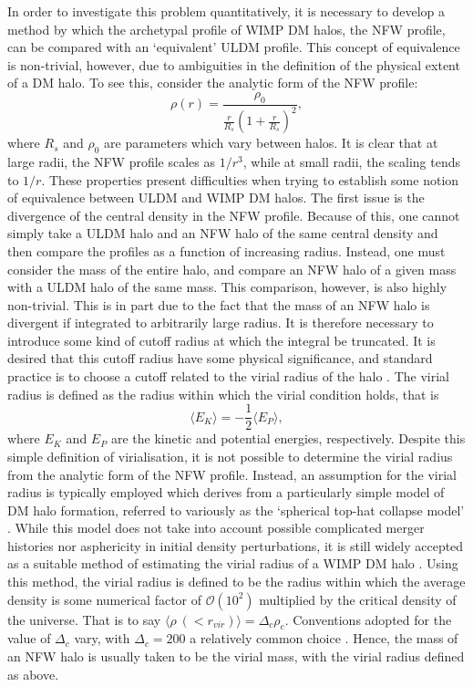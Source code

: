 In order to investigate this problem quantitatively, it is necessary to develop a method by which the archetypal profile of WIMP DM halos, the NFW profile, can be compared with an `equivalent' ULDM profile. This concept of equivalence is non-trivial, however, due to ambiguities in the definition of the physical extent of a DM halo. To see this, consider the analytic form of the NFW profile:
\begin{equation}
    \rho(r)=\frac{\rho_0}{\frac{r}{R_s}\left(1+\frac{r}{R_s}\right)^2},
\end{equation}
where $R_s$ and $\rho_0$ are parameters which vary between halos. It is clear that at large radii, the NFW profile scales as $1/r^3$, while at small radii, the scaling tends to $1/r$. These properties present difficulties when trying to establish some notion of equivalence between ULDM and WIMP DM halos. The first issue is the divergence of the central density in the NFW profile. Because of this, one cannot simply take a ULDM halo and an NFW halo of the same central density and then compare the profiles as a function of increasing radius. Instead, one must consider the mass of the entire halo, and compare an NFW halo of a given mass with a ULDM halo of the same mass. This comparison, however, is also highly non-trivial. This is in part due to the fact that the mass of an NFW halo is divergent if integrated to arbitrarily large radius. It is therefore necessary to introduce some kind of cutoff radius at which the integral be truncated. It is desired that this cutoff radius have some physical significance, and standard practice is to choose a cutoff related to the virial radius of the halo \cite{White:2000jv}. The virial radius is defined as the radius within which the virial condition holds, that is
\begin{equation}
    \langle E_K\rangle = -\frac{1}{2}\langle E_P\rangle,
\end{equation}
where $E_K$ and $E_P$ are the kinetic and potential energies, respectively. Despite this simple definition of virialisation, it is not possible to determine the virial radius from the analytic form of the NFW profile. Instead, an assumption for the virial radius is typically employed which derives from a particularly simple model of DM halo formation, referred to variously as the `spherical top-hat collapse model' \cite{Herrera:2017epn}. While this model does not take into account possible complicated merger histories nor asphericity in initial density perturbations, it is still widely accepted as a suitable method of estimating the virial radius of a WIMP DM halo \cite{Suto:2015jdt, 2010arXiv1005.0411C}. Using this method, the virial radius is defined to be the radius within which the average density is some numerical factor of $\mathcal{O}(10^2)$ multiplied by the critical density of the universe. That is to say $\langle \rho\ (<r_{vir})\rangle = \Delta_c\rho_c$. Conventions adopted for the value of $\Delta_c$ vary, with $\Delta_c=200$ a relatively common choice \cite{Zemp:2013bga}. Hence, the mass of an NFW halo is usually taken to be the virial mass, with the virial radius defined as above.

